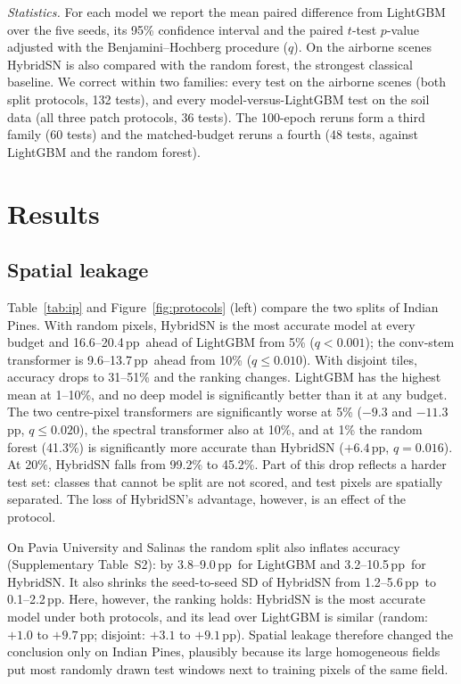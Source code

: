 \documentclass[]{interact}
\newcommand{\pp}{\,pp}
\begin{document}
\emph{Statistics.} For each model we report the mean paired difference from LightGBM over the five seeds, its 95\% confidence interval and the paired $t$-test $p$-value adjusted with the Benjamini--Hochberg procedure ($q$). On the airborne scenes HybridSN is also compared with the random forest, the strongest classical baseline. We correct within two families: every test on the airborne scenes (both split protocols, 132 tests), and every model-versus-LightGBM test on the soil data (all three patch protocols, 36 tests). The 100-epoch reruns form a third family (60 tests) and the matched-budget reruns a fourth (48 tests, against LightGBM and the random forest).

\section{Results}\label{sec:results}

\subsection{Spatial leakage}
Table~\ref{tab:ip} and Figure~\ref{fig:protocols} (left) compare the two splits of Indian Pines. With random pixels, HybridSN is the most accurate model at every budget and 16.6--20.4\pp\ ahead of LightGBM from 5\% ($q<0.001$); the conv-stem transformer is 9.6--13.7\pp\ ahead from 10\% ($q\le0.010$). With disjoint tiles, accuracy drops to 31--51\% and the ranking changes. LightGBM has the highest mean at 1--10\%, and no deep model is significantly better than it at any budget. The two centre-pixel transformers are significantly worse at 5\% ($-9.3$ and $-11.3$\pp, $q\le0.020$), the spectral transformer also at 10\%, and at 1\% the random forest (41.3\%) is significantly more accurate than HybridSN ($+6.4$\pp, $q=0.016$). At 20\%, HybridSN falls from 99.2\% to 45.2\%. Part of this drop reflects a harder test set: classes that cannot be split are not scored, and test pixels are spatially separated. The loss of HybridSN's advantage, however, is an effect of the protocol.

On Pavia University and Salinas the random split also inflates accuracy (Supplementary Table~S2): by 3.8--9.0\pp\ for LightGBM and 3.2--10.5\pp\ for HybridSN. It also shrinks the seed-to-seed SD of HybridSN from 1.2--5.6\pp\ to 0.1--2.2\pp. Here, however, the ranking holds: HybridSN is the most accurate model under both protocols, and its lead over LightGBM is similar (random: $+1.0$ to $+9.7$\pp; disjoint: $+3.1$ to $+9.1$\pp). Spatial leakage therefore changed the conclusion only on Indian Pines, plausibly because its large homogeneous fields put most randomly drawn test windows next to training pixels of the same field.
\end{document}
